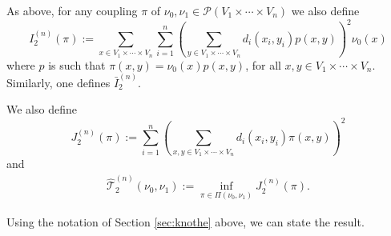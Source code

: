 \documentclass[11pt]{amsart}
\numberwithin{equation}{section}
\begin{document}
As above, for any coupling $\pi$ of $\nu_0, \nu_1 \in \mathcal{P}(V_1 \times\cdots \times V_{n})$ we also define
$$
I_2^{(n)}(\pi) := \sum_{x \in V_1 \times\cdots \times V_{n}} \sum_{i=1}^n  \left( \sum_{y \in V_1 \times\cdots \times V_{n}} d_i(x_i,y_i) p(x,y) \right)^2 \nu_0(x)
$$
where $p$ is such that $\pi(x,y) = \nu_0(x)p(x,y)$, for all $x,y \in V_1 \times\cdots \times V_{n}$. Similarly, one defines $\bar{I}^{(n)}_{2}$.

We also define 
$$
J_2^{(n)}(\pi) := \sum_{i=1}^n  \left( \sum_{x,y \in V_1 \times\cdots \times V_{n}} d_i(x_i,y_i) \pi(x,y) \right)^2 
$$
and 
\begin{align*}
\hat {\mathcal{T}}_{2}^{(n)}(\nu_0 ,\nu_1 ) 
 := 
\inf_{\pi \in \Pi(\nu_0,\nu_1)} J_2^{(n)}(\pi).
\end{align*}

Using the notation of Section \ref{sec:knothe} above, we can state the result.
\end{document}

